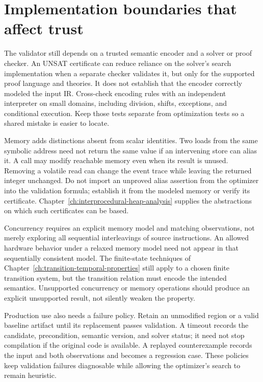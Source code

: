 \section{Implementation boundaries that affect trust}
\label{sec:ch47-trust}

The validator still depends on a trusted semantic encoder and a solver or proof checker.
An UNSAT certificate can reduce reliance on the solver's search implementation when a separate checker validates it, but only for the supported proof language and theories.
It does not establish that the encoder correctly modeled the input IR.
Cross-check encoding rules with an independent interpreter on small domains, including division, shifts, exceptions, and conditional execution.
Keep those tests separate from optimization tests so a shared mistake is easier to locate.

Memory adds distinctions absent from scalar identities.
Two loads from the same symbolic address need not return the same value if an intervening store can alias it.
A call may modify reachable memory even when its result is unused.
Removing a volatile read can change the event trace while leaving the returned integer unchanged.
Do not import an unproved alias assertion from the optimizer into the validation formula; establish it from the modeled memory or verify its certificate.
Chapter~\ref{ch:interprocedural-heap-analysis} supplies the abstractions on which such certificates can be based.

Concurrency requires an explicit memory model and matching observations, not merely exploring all sequential interleavings of source instructions.
An allowed hardware behavior under a relaxed memory model need not appear in that sequentially consistent model.
The finite-state techniques of Chapter~\ref{ch:transition-temporal-properties} still apply to a chosen finite transition system, but the transition relation must encode the intended semantics.
Unsupported concurrency or memory operations should produce an explicit unsupported result, not silently weaken the property.

Production use also needs a failure policy.
Retain an unmodified region or a valid baseline artifact until its replacement passes validation.
A timeout records the candidate, precondition, semantic version, and solver status; it need not stop compilation if the original code is available.
A replayed counterexample records the input and both observations and becomes a regression case.
These policies keep validation failures diagnosable while allowing the optimizer's search to remain heuristic.

